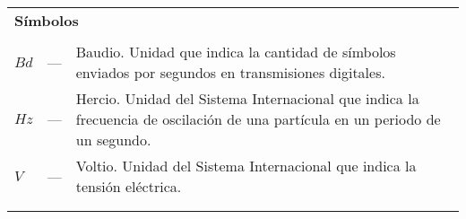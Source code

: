 \begin{longtable}{lcp{} }
\multicolumn{3}{l}{\textbf{Símbolos}}\\
\\
$Bd$ & --- & Baudio. Unidad que indica la cantidad de símbolos enviados por segundos en transmisiones digitales.\\

$Hz$ & --- & Hercio. Unidad del Sistema Internacional que indica la frecuencia de oscilación de una partícula en un periodo de un segundo.\\

$V$ & --- & Voltio. Unidad del Sistema Internacional que indica la tensión eléctrica.\\

\\
\\

\end{longtable}

